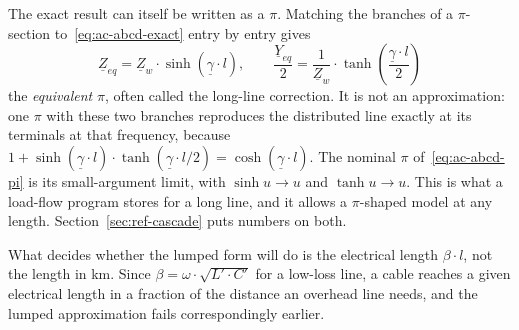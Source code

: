 The exact result can itself be written as a $\pi$. Matching the branches of a
$\pi$-section to~\eqref{eq:ac-abcd-exact} entry by entry gives
\begin{equation}
  \underline{Z}_{eq} = \underline{Z}_w \cdot
      \sinh\left(\underline{\gamma} \cdot l\right),
  \qquad
  \frac{\underline{Y}_{eq}}{2} = \frac{1}{\underline{Z}_w} \cdot
      \tanh\left(\frac{\underline{\gamma} \cdot l}{2}\right)
  \label{eq:ac-equivalent-pi}
\end{equation}
the \emph{equivalent} $\pi$, often called the long-line correction. It is not
an approximation: one $\pi$ with these two branches reproduces the
distributed line exactly at its terminals at that frequency, because
$1 + \sinh\left(\underline{\gamma} \cdot l\right) \cdot
\tanh\left(\underline{\gamma} \cdot l / 2\right) =
\cosh\left(\underline{\gamma} \cdot l\right)$. The nominal $\pi$
of~\eqref{eq:ac-abcd-pi} is its small-argument limit, with
$\sinh u \to u$ and $\tanh u \to u$. This is what a load-flow program
stores for a long line, and it allows a $\pi$-shaped model at any
length. Section~\ref{sec:ref-cascade} puts numbers on both.

What decides whether the lumped form will do is the electrical length
$\beta \cdot l$, not the length in km. Since $\beta = \omega \cdot
\sqrt{L' \cdot C'}$ for a low-loss line, a cable reaches a given electrical
length in a fraction of the distance an overhead line needs, and the lumped
approximation fails correspondingly earlier.

\FloatBarrier
